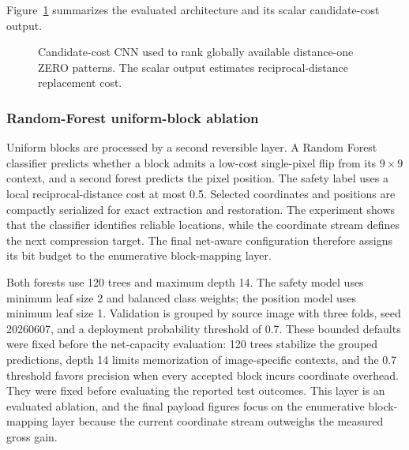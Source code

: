 \documentclass[a4paper,fleqn]{cas-dc}
\begin{document}
Figure~\ref{fig:cnn-architecture} summarizes the evaluated architecture and
its scalar candidate-cost output.

\begin{figure}[t]
\centering
{}
\caption{Candidate-cost CNN used to rank globally available distance-one ZERO
patterns. The scalar output estimates reciprocal-distance replacement cost.}
\label{fig:cnn-architecture}
\end{figure}

\subsubsection*{Random-Forest uniform-block ablation}
\label{subsec:rf-layer}

Uniform blocks are processed by a second reversible layer. A Random Forest
classifier predicts whether a block admits a low-cost single-pixel flip from
its $9\times9$ context, and a second forest predicts the pixel position. The
safety label uses a local reciprocal-distance cost at most 0.5.
Selected coordinates and positions are compactly serialized for exact
extraction and restoration. The experiment shows that the classifier
identifies reliable locations, while the coordinate stream defines the next
compression target. The final net-aware configuration therefore assigns its
bit budget to the enumerative block-mapping layer.

Both forests use 120 trees and maximum depth 14. The safety model uses
minimum leaf size 2 and balanced class weights; the position model uses
minimum leaf size 1. Validation is grouped by source image with three folds,
seed 20260607, and a deployment probability threshold of 0.7. These bounded
defaults were fixed before the net-capacity evaluation: 120 trees stabilize
the grouped predictions, depth 14 limits memorization of image-specific
contexts, and the 0.7 threshold favors precision when every accepted block
incurs coordinate overhead. They were fixed before evaluating the reported
test outcomes. This layer is an evaluated ablation, and the final payload
figures focus on the enumerative block-mapping layer because the current
coordinate stream outweighs the measured gross gain.
\end{document}
